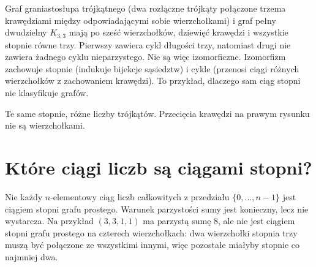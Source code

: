 \begin{przyklad}
Graf graniastosłupa trójkątnego (dwa rozłączne trójkąty
połączone trzema krawędziami między odpowiadającymi sobie
wierzchołkami) i graf pełny dwudzielny $K_{3,3}$ mają po sześć wierzchołków, dziewięć krawędzi i wszystkie stopnie
równe trzy. Pierwszy zawiera cykl długości trzy, natomiast drugi
nie zawiera żadnego cyklu nieparzystego. Nie są więc izomorficzne.
Izomorfizm zachowuje stopnie (indukuje bijekcje sąsiedztw)
i cykle (przenosi ciągi różnych wierzchołków z zachowaniem
krawędzi). To przykład, dlaczego sam ciąg stopni nie klasyfikuje grafów.
\end{przyklad}

\begin{center}

{\footnotesize Te same stopnie, różne liczby trójkątów.
Przecięcia krawędzi na prawym rysunku nie są wierzchołkami.}
\end{center}

\section{Które ciągi liczb są ciągami stopni?}
\label{sec:tg-havel}

Nie każdy $n$-elementowy ciąg liczb całkowitych z przedziału
$\{0,\ldots,n-1\}$ jest ciągiem stopni grafu prostego.
Warunek parzystości sumy jest konieczny, lecz nie wystarcza.
Na przykład $(3,3,1,1)$ ma parzystą sumę $8$, ale nie jest
ciągiem stopni grafu prostego na czterech wierzchołkach:
dwa wierzchołki stopnia trzy muszą być połączone ze wszystkimi
innymi, więc pozostałe miałyby stopnie co najmniej dwa.

